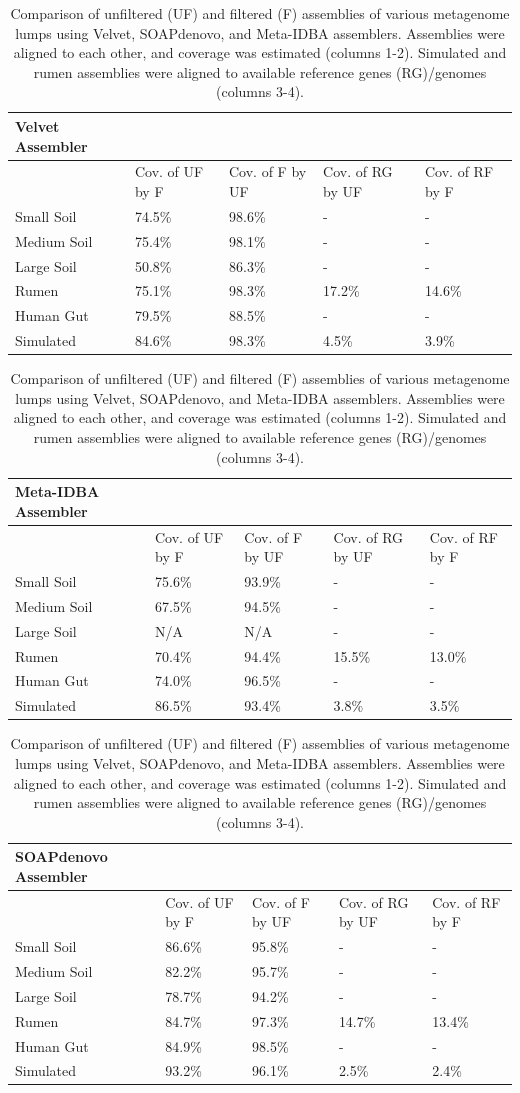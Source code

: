 \documentclass[10pt]{article}
\begin{document}
\begin{landscape}
\begin{table}[ht]
\caption{Comparison of unfiltered (UF) and filtered (F) assemblies of various metagenome lumps using Velvet, SOAPdenovo, and Meta-IDBA assemblers.  Assemblies were aligned to each other, and coverage was estimated (columns 1-2).  Simulated and rumen assemblies were aligned to available reference genes (RG)/genomes (columns 3-4).}

\begin{tabular}{*{5}{p{3cm}}}
Velvet Assembler  \\ 
\hline
& Cov. of UF by F & Cov. of F by UF  & Cov. of RG  by UF  & Cov. of RF by F \\
\hline
Small Soil		&74.5\%		&98.6\%		&-		&-\\
Medium Soil	&75.4\%		&98.1\%		&-		&-\\
Large Soil		&50.8\%		&86.3\%		&-		&-\\
Rumen		&75.1\%		&98.3\%		&17.2\%	&14.6\%\\
Human Gut 	&79.5\%		&88.5\%		&-		&-\\
Simulated		&84.6\%		&98.3\%		&4.5\%	&3.9\%\\
\end{tabular}

\begin{tabular}{*{5}{p{3cm}}}
Meta-IDBA Assembler  \\ 
\hline
& Cov. of UF by F & Cov. of F by UF  & Cov. of RG  by UF  & Cov. of RF by F \\
\hline
Small Soil		&75.6\%		&93.9\%		&-		&-\\
Medium Soil	&67.5\%		&94.5\%		&-		&-\\
Large Soil		&N/A			&N/A			&-		&-\\
Rumen		&70.4\%		&94.4\%		&15.5\%	&13.0\%\\
Human Gut 	&74.0\%		&96.5\%		&-		&-\\
Simulated		&86.5\%		&93.4\%		&3.8\%	&3.5\%\\
\end{tabular}

\begin{tabular}{*{5}{p{3cm}}}
SOAPdenovo Assembler  \\ 
\hline
& Cov. of UF by F & Cov. of F by UF  & Cov. of RG  by UF  & Cov. of RF by F \\
\hline
Small Soil		&86.6\%		&95.8\%		&-		&-\\
Medium Soil	&82.2\%		&95.7\%		&-		&-\\
Large Soil		&78.7\%		&94.2\%		&-		&-\\
Rumen		&84.7\%		&97.3\%		&14.7\%	&13.4\%\\
Human Gut 	&84.9\%		&98.5\%		&-		&-\\
Simulated		&93.2\%		&96.1\%		&2.5\%	&2.4\%\\
\end{tabular}
\end{table}
\end{landscape}
\end{document}
